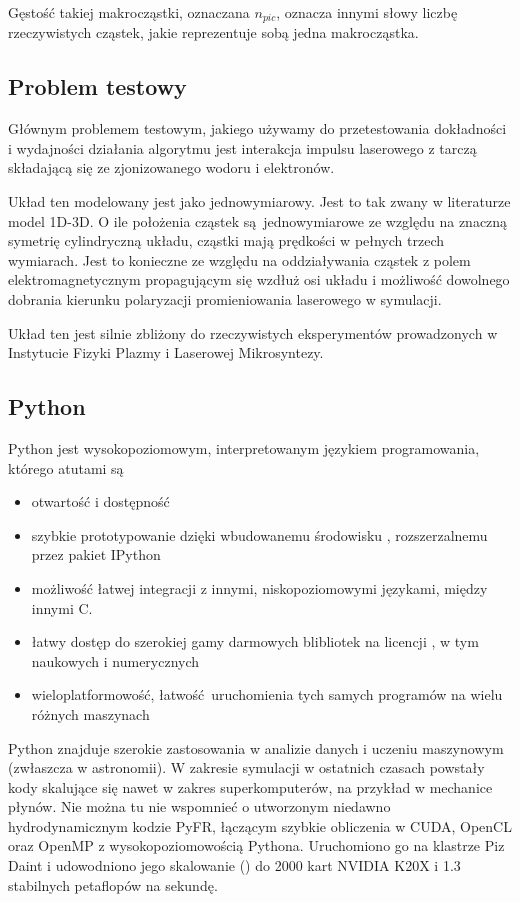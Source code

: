     Gęstość takiej makrocząstki, oznaczana $n_{pic}$, oznacza innymi słowy
    liczbę rzeczywistych cząstek, jakie reprezentuje sobą jedna makrocząstka.

    \subsection{Problem testowy}

    Głównym problemem testowym, jakiego używamy do przetestowania dokładności i
    wydajności działania algorytmu jest interakcja impulsu laserowego z tarczą
    składającą się ze zjonizowanego wodoru i elektronów.

    Układ ten modelowany jest jako jednowymiarowy. Jest to tak zwany w
    literaturze model 1D-3D.  O ile położenia cząstek są jednowymiarowe ze
    względu na znaczną symetrię cylindryczną układu, cząstki mają prędkości w
    pełnych trzech wymiarach. Jest to konieczne ze względu na oddziaływania
    cząstek z polem elektromagnetycznym propagującym się wzdłuż osi układu
    i możliwość dowolnego dobrania kierunku polaryzacji promieniowania
    laserowego w symulacji.

    Układ ten jest silnie zbliżony do rzeczywistych eksperymentów prowadzonych
    w Instytucie Fizyki Plazmy i Laserowej Mikrosyntezy.  

    \subsection{Python}
    Python jest wysokopoziomowym, interpretowanym językiem programowania,
    którego atutami są
    \begin{itemize}
    \item otwartość i dostępność
    \item szybkie prototypowanie dzięki wbudowanemu środowisku , rozszerzalnemu przez pakiet IPython\cite{ipython}
    \item możliwość łatwej integracji z innymi, niskopoziomowymi językami, między innymi C.
    \item łatwy dostęp do szerokiej gamy darmowych blibliotek na licencji , w tym naukowych i numerycznych
    \item wieloplatformowość, łatwość uruchomienia tych samych programów na wielu różnych maszynach
    \end{itemize}

    Python znajduje szerokie zastosowania w analizie danych i uczeniu maszynowym
    (zwłaszcza w astronomii\cite{astropy}). W zakresie symulacji w ostatnich czasach powstały
    kody skalujące się nawet w zakres superkomputerów, na przykład w mechanice
    płynów.  Nie można tu nie wspomnieć o utworzonym niedawno hydrodynamicznym kodzie
    PyFR, łączącym szybkie obliczenia w CUDA, OpenCL oraz OpenMP z wysokopoziomowością Pythona. Uruchomiono go na klastrze Piz Daint
    i udowodniono jego skalowanie () do 2000 kart NVIDIA K20X i 1.3 stabilnych petaflopów na sekundę.
    \cite{pyfr}\cite{pyfr-euroscipy}


